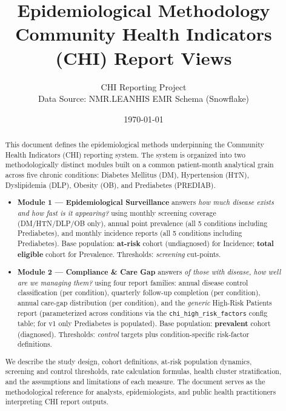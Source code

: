 \documentclass[11pt,a4paper]{article}
\title{\textbf{Epidemiological Methodology}\\[4pt]
       \large Community Health Indicators (CHI) Report Views}
\author{%
    \small CHI Reporting Project\\
    \small Data Source: NMR.LEANHIS EMR Schema (Snowflake)
}
\date{\small \today}
\begin{document}
\maketitle
\thispagestyle{empty}

\begin{abstract}
\noindent
This document defines the epidemiological methods underpinning the Community Health Indicators (CHI) reporting system. The system is organized into two methodologically distinct modules built on a common patient-month analytical grain across five chronic conditions: Diabetes Mellitus (DM), Hypertension (HTN), Dyslipidemia (DLP), Obesity (OB), and Prediabetes (PREDIAB).

\begin{itemize}[leftmargin=*, itemsep=2pt]
    \item \textbf{Module 1 --- Epidemiological Surveillance} answers \textit{how much disease exists and how fast is it appearing?} using monthly screening coverage (DM/HTN/DLP/OB only), annual point prevalence (all 5 conditions including Prediabetes), and monthly incidence reports (all 5 conditions including Prediabetes). Base population: \textbf{at-risk} cohort (undiagnosed) for Incidence; \textbf{total eligible} cohort for Prevalence. Thresholds: \textit{screening} cut-points.
    \item \textbf{Module 2 --- Compliance \& Care Gap} answers \textit{of those with disease, how well are we managing them?} using four report families: annual disease control classification (per condition), quarterly follow-up completion (per condition), annual care-gap distribution (per condition), and the \emph{generic} High-Risk Patients report (parameterized across conditions via the \texttt{chi\_high\_risk\_factors} config table; for v1 only Prediabetes is populated). Base population: \textbf{prevalent} cohort (diagnosed). Thresholds: \textit{control} targets plus condition-specific risk-factor definitions.
\end{itemize}

We describe the study design, cohort definitions, at-risk population dynamics, screening and control thresholds, rate calculation formulas, health cluster stratification, and the assumptions and limitations of each measure. The document serves as the methodological reference for analysts, epidemiologists, and public health practitioners interpreting CHI report outputs.
\end{abstract}

\vspace{12pt}
\tableofcontents
\newpage
\end{document}
